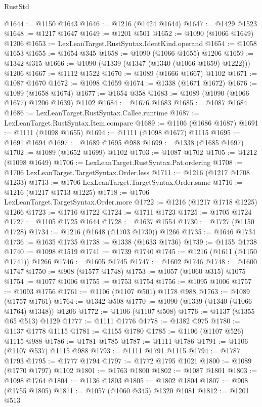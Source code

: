 \begin{lexlean}{RustStd}
\begin{coremodule}
@1644 := @1150 @1643
@1646 := @1216 (@1424 @1644)
@1647 := @1429 @1523
@1648 := @1217 @1647
@1649 := @1201 @501
@1652 := @1090 (@1066 @1649) @1206
@1653 := LexLeanTarget.RustSyntax.IdentKind.operand
@1654 := @1058 @1653
@1655 := @1654 @345
@1658 := @1090 (@1066 @1655) @1206
@1659 := @1342 @315
@1666 := @1090 (@1339 (@1347 (@1340 (@1066 @1659) @1222))) @1206
@1667 := @1112 @1522
@1670 := @1089 (@1666 @1667) @1102
@1671 := @1087 @1670
@1672 := @1098 @1659
@1674 := @1338 (@1671 @1672)
@1676 := @1089 (@1658 @1674)
@1677 := @1654 @358
@1683 := @1089 (@1090 (@1066 @1677) @1206 @1639) @1102
@1684 := @1676 @1683
@1685 := @1087 @1684
@1686 := LexLeanTarget.RustSyntax.Callee.runtime
@1687 := LexLeanTarget.RustSyntax.Item.compare
@1689 := @1106 (@1686 @1687)
@1691 := @1111 (@1098 @1655)
@1694 := @1111 (@1098 @1677) @1115
@1695 := @1691 @1694
@1697 := @1689 @1695 @988
@1699 := @1338 (@1685 @1697)
@1702 := @1089 (@1652 @1699) @1102
@1703 := @1087 @1702
@1705 := @1212 (@1098 @1649)
@1706 := LexLeanTarget.RustSyntax.Pat.ordering
@1708 := @1706 LexLeanTarget.TargetSyntax.Order.less
@1711 := @1216 (@1217 @1708 @1233)
@1713 := @1706 LexLeanTarget.TargetSyntax.Order.same
@1716 := @1216 (@1217 @1713 @1225)
@1718 := @1706 LexLeanTarget.TargetSyntax.Order.more
@1722 := @1216 (@1217 @1718 @1225) @1266
@1723 := @1716 @1722
@1724 := @1711 @1723
@1725 := @1705 @1724
@1727 := @1105 @1725 @1644
@1728 := @1637 @1554
@1730 := @1727 (@1150 @1728)
@1734 := @1216 (@1648 (@1703 @1730)) @1266
@1735 := @1646 @1734
@1736 := @1635 @1735
@1738 := @1338 (@1633 @1736)
@1739 := @1155 @1738
@1740 := @1098 @1519
@1741 := @1739 @1740
@1745 := @1216 (@1611 (@1150 @1741)) @1266
@1746 := @1605 @1745
@1747 := @1602 @1746
@1748 := @1600 @1747
@1750 := @908 (@1577 @1748)
@1753 := @1057 (@1060 @315) @1075
@1754 := @1077 @1006
@1755 := @1753 @1754
@1756 := @1095 @1006
@1757 := @1093 @1756
@1761 := @1106 (@1107 @501) @1178 @988
@1763 := @1089 (@1757 @1761)
@1764 := @1342 @508
@1770 := @1090 (@1339 (@1340 (@1066 @1764) @1348)) @1206
@1772 := @1106 (@1107 @508)
@1776 := @1137 (@1355 @65 @513) @1129
@1777 := @1111 @1776
@1778 := @1382 @975
@1780 := @1137 @1778 @1115
@1781 := @1155 @1780
@1785 := @1106 (@1107 @526) @1115 @988
@1786 := @1781 @1785
@1787 := @1111 @1786
@1791 := @1106 (@1107 @537) @1115 @988
@1793 := @1111 @1791 @1115
@1794 := @1787 @1793
@1795 := @1777 @1794
@1797 := @1772 @1795 @1021
@1800 := @1089 (@1770 @1797) @1102
@1801 := @1763 @1800
@1802 := @1087 @1801
@1803 := @1098 @1764
@1804 := @1136 @1803
@1805 := @1802 @1804
@1807 := @908 (@1755 @1805)
@1811 := @1057 (@1060 @345) @1320 @1081
@1812 := @1201 @513

\end{coremodule}
\end{lexlean}
